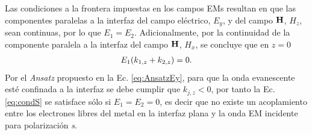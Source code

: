 	
\noindent   Las condiciones a la frontera impuestas en los campos EMs resultan en que las componentes paralelas a la interfaz del campo eléctrico, $E_y$, y del campo $\vb{H}$, $H_z$, sean continuas, por lo que $E_1 = E_2$. Adicionalmente, por la continuidad de la componente paralela a la interfaz del  campo $\vb{H}$, $H_x$, se concluye que en $z=0$
%
	\begin{align}
	E_1\qty(k_{1,z}+k_{2,z})= 0. \label{eq:condS}
	\end{align}
%
Por el \emph{Ansatz} propuesto en la Ec. \eqref{eq:AnsatzEy}, para que la onda evanescente esté confinada a la interfaz se debe cumplir que $k_{j,z}<0$, por tanto la Ec. \eqref{eq:condS} se satisface sólo si $E_1 = E_2 = 0$, es decir  que no existe un acoplamiento entre los electrones libres del metal en la interfaz plana y la onda EM incidente para polarización \emph{s}.

